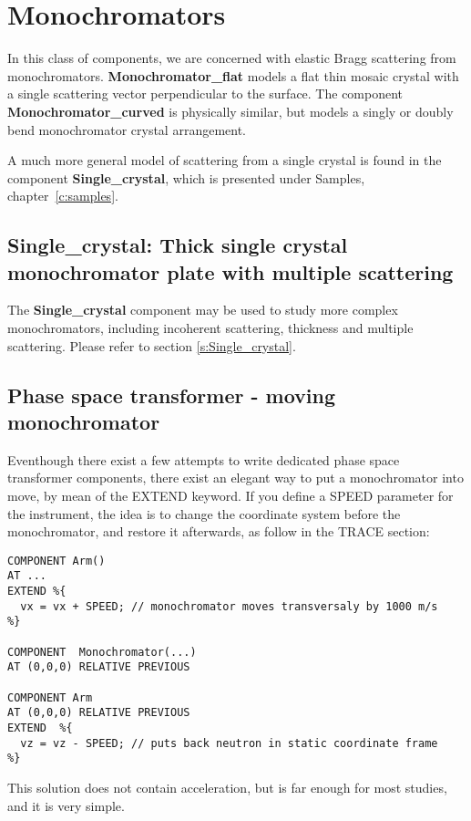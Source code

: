 
\chapter{Monochromators}

In this class of components, we are concerned with elastic Bragg
scattering from monochromators. {\bf Monochromator\_flat}
models a flat thin mosaic crystal with a single scattering vector
perpendicular to the surface.
The component {\bf Monochromator\_curved} is physically similar,
but models a singly or doubly bend monochromator crystal arrangement.

A much more general model of scattering from a single crystal is
found in the component {\bf Single\_crystal},
which is presented under Samples, chapter~\ref{c:samples}.





\section{Single\_crystal: Thick single crystal monochromator plate with multiple scattering}

The {\bf Single\_crystal} component may be used to study more complex monochromators, including incoherent scattering, thickness and multiple scattering. Please refer to section \ref{s:Single_crystal}.

\section{Phase space transformer - moving monochromator}

Eventhough there exist a few attempts to write dedicated phase space transformer components, there exist an elegant way to put a monochromator into move, by mean of the EXTEND keyword. If you define a SPEED parameter for the instrument, the idea is to change the coordinate system before the monochromator, and restore it afterwards, as follow in the TRACE section:
\begin{verbatim}
COMPONENT Arm()
AT ...
EXTEND %{
  vx = vx + SPEED; // monochromator moves transversaly by 1000 m/s
%}

COMPONENT  Monochromator(...)
AT (0,0,0) RELATIVE PREVIOUS

COMPONENT Arm
AT (0,0,0) RELATIVE PREVIOUS
EXTEND  %{
  vz = vz - SPEED; // puts back neutron in static coordinate frame
%}
\end{verbatim}
This solution does not contain acceleration, but is far enough for most
studies, and it is very simple.
